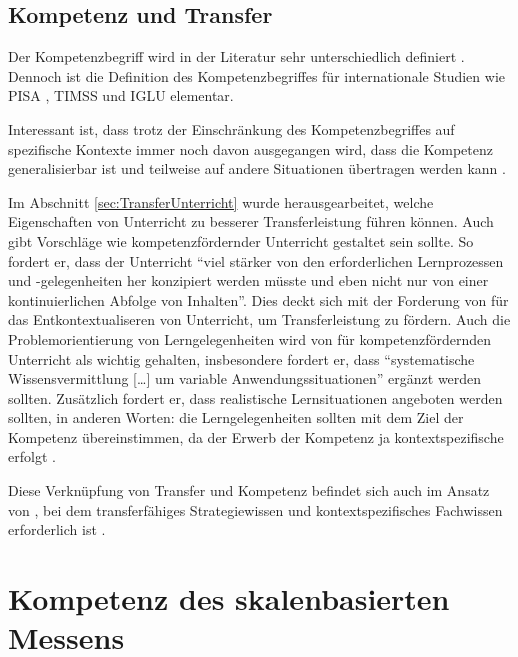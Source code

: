 \subsection{Kompetenz und Transfer}
Der Kompetenzbegriff wird in der Literatur sehr unterschiedlich definiert \citep{Klieme2004, Weinert2001b}. Dennoch ist die Definition des Kompetenzbegriffes für internationale Studien wie PISA \citep{PISA-KonsortiumDeuschland2004}, TIMSS \citep{Martin2003} und IGLU \citep{Bos2003} elementar.


Interessant ist, dass trotz der Einschränkung des Kompetenzbegriffes auf spezifische Kontexte immer noch davon ausgegangen wird, dass die Kompetenz generalisierbar ist und teilweise auf andere Situationen übertragen werden kann \citep{Hartig2006}.

Im Abschnitt \ref{sec:TransferUnterricht} wurde herausgearbeitet, welche Eigenschaften von Unterricht zu besserer Transferleistung führen können. Auch \citet{Lersch2007} gibt Vorschläge wie kompetenzfördernder Unterricht gestaltet sein sollte. So fordert er, dass der Unterricht "`viel stärker von den erforderlichen Lernprozessen und -gelegenheiten her konzipiert werden müsste und eben nicht nur von einer kontinuierlichen Abfolge von Inhalten"'. Dies deckt sich mit der Forderung von \citet{Mietzel2007} für das Entkontextualiseren von Unterricht, um Transferleistung zu fördern. Auch die Problemorientierung von Lerngelegenheiten wird von \citet{Lersch2007} für kompetenzfördernden Unterricht als wichtig gehalten, insbesondere fordert er, dass "`systematische Wissensvermittlung […] um variable Anwendungssituationen"' ergänzt werden sollten. Zusätzlich fordert er, dass realistische Lernsituationen angeboten werden sollten, in anderen Worten: die Lerngelegenheiten sollten mit dem Ziel der Kompetenz übereinstimmen, da der Erwerb der Kompetenz ja kontextspezifische erfolgt \citep{Klieme2004}.

Diese Verknüpfung von Transfer und Kompetenz befindet sich auch im Ansatz von \citet{Gott2002}, bei dem transferfähiges Strategiewissen und kontextspezifisches Fachwissen erforderlich ist \citep{Gott1996}. 



\section{Kompetenz des skalenbasierten Messens}

